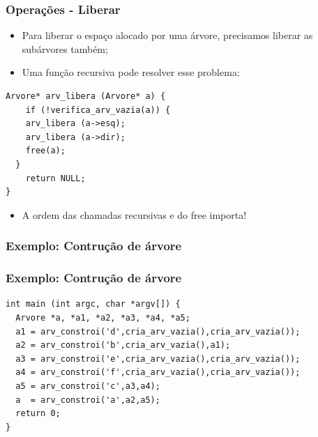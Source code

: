 \documentclass{beamer}
\begin{document}
\begin{frame}[fragile]
  \frametitle{Operações - Liberar}

  \begin{itemize}
    \item Para liberar o espaço alocado por uma árvore, precisamos liberar as subárvores também;
    \item Uma função recursiva pode resolver esse problema:
  \end{itemize}

  \begin{verbatim}
Arvore* arv_libera (Arvore* a) {
    if (!verifica_arv_vazia(a)) {
    arv_libera (a->esq);
    arv_libera (a->dir);
    free(a);
  }
    return NULL;
}
  \end{verbatim}
  
  \begin{itemize}
    \item A ordem das chamadas recursivas e do free importa! 
  \end{itemize}
\end{frame}

\begin{frame}[c]
  \frametitle{Exemplo: Contrução de árvore}

  \centering

\end{frame}

\begin{frame}[fragile]
  \frametitle{Exemplo: Contrução de árvore}

  \begin{verbatim}
int main (int argc, char *argv[]) {
  Arvore *a, *a1, *a2, *a3, *a4, *a5;
  a1 = arv_constroi('d',cria_arv_vazia(),cria_arv_vazia());
  a2 = arv_constroi('b',cria_arv_vazia(),a1);
  a3 = arv_constroi('e',cria_arv_vazia(),cria_arv_vazia());
  a4 = arv_constroi('f',cria_arv_vazia(),cria_arv_vazia());
  a5 = arv_constroi('c',a3,a4);
  a  = arv_constroi('a',a2,a5);
  return 0;
}
  \end{verbatim}
\end{frame}
\end{document}
